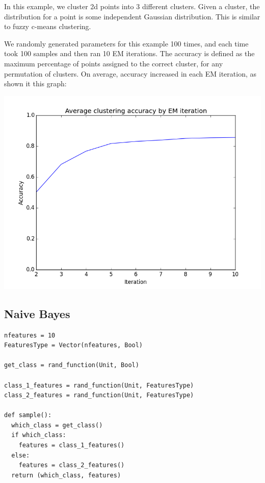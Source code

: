 \documentclass{article}
\begin{document}
In this example, we cluster 2d points into 3 different clusters.  Given a cluster, the distribution for a point is some independent Gaussian distribution.  This is similar to fuzzy c-means clustering.

We randomly generated parameters for this example 100 times, and each time took 100 samples and then ran 10 EM iterations.  The accuracy is defined as the maximum percentage of points assigned to the correct cluster, for any permutation of clusters.  On average, accuracy increased in each EM iteration, as shown it this graph:

\begin{center}
\includegraphics[scale=0.4]{cluster_accuracy.png}
\end{center}

\subsection{Naive Bayes}

{\small
\begin{verbatim}
nfeatures = 10
FeaturesType = Vector(nfeatures, Bool)

get_class = rand_function(Unit, Bool)

class_1_features = rand_function(Unit, FeaturesType)
class_2_features = rand_function(Unit, FeaturesType)

def sample():
  which_class = get_class()
  if which_class:
    features = class_1_features()
  else:
    features = class_2_features()
  return (which_class, features)
\end{verbatim}
}
\end{document}
